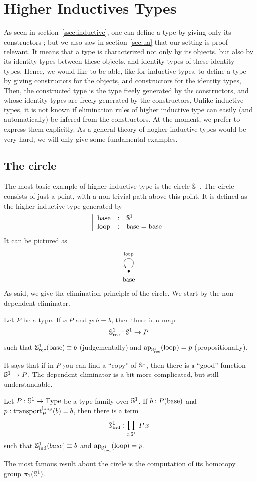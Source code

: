 \section{Higher Inductives Types}
\label{sec:hit}

As seen in section~\ref{ssec:inductive}, one can define a type by
giving only its constructors ; but we also saw in section~\ref{sec:ua}
that our setting is proof-relevant. It means that a type is
characterized not only by its objects, but also by its identity types
between these objects, and identity types of these identity types,
\etc{}
Hence, we would like to be able, like for inductive types, to define a
type by giving constructors for the objects, and constructors for the
identity types, \etc{} Then, the constructed type is the type freely
generated by the constructors, and whose identity types are freely
generated by the constructors, \etc{}
Unlike inductive types, it is not known if elimination rules of higher
inductive type can easily (and automatically) be infered from the
constructors. At the moment, we prefer to express them
explicitly. As a general theory of hogher inductive types would be
very hard, we will only give some fundamental examples.


\subsection{The circle}
\label{ssec:S1}

The most basic example of higher inductive type is the circle
$\mathbb{S}^1$. The circle consists of just a point, with a non-trivial
path above this point. It is defined as the higher inductive type
generated by
\[ \left| 
    \begin{array}{lll}
      \mathrm{base} & : & \mathbb{S}^1 \\
      \mathrm{loop} & : & \mathrm{base} = \mathrm{base}
    \end{array}
    \right.
\]
It can be pictured as
\[
  \xymatrix@R=0.1em{ \bullet \ar@(ur,ul)[]_\loopS \\ \baseS}
\]
As said, we give the elimination principle of the circle. We start by
the non-dependent eliminator.
\begin{lem}\label{lem:S1_rec}
  Let $P$ be a type. If $b:P$ and $p:b = b$, then there is a map
  \[\mathbb{S}^1_{\mathrm{rec}} : \mathbb{S}^1 \to P \]
  such that $\mathbb{S}^1_{\mathrm{rec}}(\mathrm{base}) \equiv b$ (judgementally) and
  $\mathrm{ap}_{\mathbb{S}^1_{\mathrm{rec}}}(\mathrm{loop}) = p$ (propositionally).
\end{lem}
It says that if in $P$ you can find a ``copy'' of $\mathbb{S}^1$, then there
is a ``good'' function $\mathbb{S}^1 \to P$.
The dependent eliminator is a bit more complicated, but still
understandable.
\begin{lem}\label{lem:S1_ind}
  Let $P:\mathbb{S}^1\to\operatorname{Type}$ be a type family over $\mathbb{S}^1$. If
  $b:P(\mathrm{base})$ and $p:\operatorname{transport}_P^{\mathrm{loop}}(b) = b$, then there is a term
  \[ \mathbb{S}^1_{\mathrm{ind}} : \prod_{x:\mathbb{S}^1}\, P\, x\]
  such that $\mathbb{S}^1_{\mathrm{ind}}(base) \equiv b$ and
  $\mathrm{ap}_{\mathbb{S}^1_{\mathrm{ind}}}(\mathrm{loop}) = p$.
\end{lem}
The most famous result about the circle is the computation of its
homotopy group $\pi_1(\mathbb{S}^1)$.

